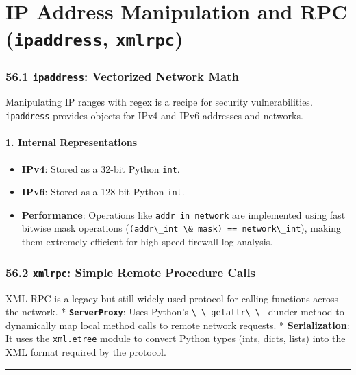 \hypertarget{ip-address-manipulation-and-rpc-ipaddress-xmlrpc}{%
\chapter{\texorpdfstring{IP Address Manipulation and RPC
(\texttt{ipaddress},
\texttt{xmlrpc})}{IP Address Manipulation and RPC (ipaddress, xmlrpc)}}\label{ip-address-manipulation-and-rpc-ipaddress-xmlrpc}}

\hypertarget{ipaddress-vectorized-network-math}{%
\subsection{\texorpdfstring{56.1 \texttt{ipaddress}: Vectorized Network
Math}{56.1 ipaddress: Vectorized Network Math}}\label{ipaddress-vectorized-network-math}}

Manipulating IP ranges with regex is a recipe for security
vulnerabilities. \passthrough{\lstinline!ipaddress!} provides objects
for IPv4 and IPv6 addresses and networks.

\hypertarget{internal-representations}{%
\subsubsection{1. Internal
Representations}\label{internal-representations}}

\begin{itemize}
\tightlist
\item
  \textbf{IPv4}: Stored as a 32-bit Python
  \passthrough{\lstinline!int!}.
\item
  \textbf{IPv6}: Stored as a 128-bit Python
  \passthrough{\lstinline!int!}.
\item
  \textbf{Performance}: Operations like
  \passthrough{\lstinline!addr in network!} are implemented using fast
  bitwise mask operations
  (\passthrough{\lstinline!(addr\_int \& mask) == network\_int!}),
  making them extremely efficient for high-speed firewall log analysis.
\end{itemize}

\hypertarget{xmlrpc-simple-remote-procedure-calls}{%
\subsection{\texorpdfstring{56.2 \texttt{xmlrpc}: Simple Remote
Procedure
Calls}{56.2 xmlrpc: Simple Remote Procedure Calls}}\label{xmlrpc-simple-remote-procedure-calls}}

XML-RPC is a legacy but still widely used protocol for calling functions
across the network. * \textbf{\passthrough{\lstinline!ServerProxy!}}:
Uses Python's \passthrough{\lstinline!\_\_getattr\_\_!} dunder method to
dynamically map local method calls to remote network requests. *
\textbf{Serialization}: It uses the \passthrough{\lstinline!xml.etree!}
module to convert Python types (ints, dicts, lists) into the XML format
required by the protocol.

\begin{center}\rule{0.5\linewidth}{0.5pt}\end{center}
